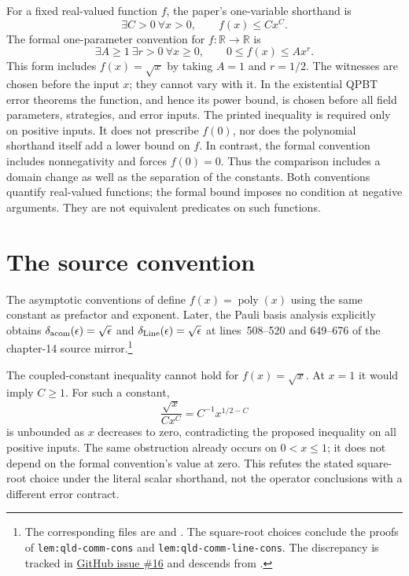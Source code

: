 \documentclass[11pt]{article}
\begin{document}
For a fixed real-valued function $f$, the paper's one-variable shorthand is
\[
  \exists C>0\ \forall x>0,\qquad f(x) \leq Cx^C.
\]
The formal one-parameter convention for $f:\mathbb R\to\mathbb R$ is
\[
  \exists A\geq1\ \exists r>0\ \forall x\geq0,\qquad
  0\leq f(x)\leq Ax^r.
\]
This form includes $f(x)=\sqrt{x}$ by taking $A=1$ and $r=1/2$.
The witnesses are chosen before the input $x$; they cannot vary with it.
In the existential QPBT error theorems the function, and hence its power
bound, is chosen before all field parameters, strategies, and error inputs.
The printed inequality is required only on positive inputs. It does not
prescribe $f(0)$, nor does the polynomial shorthand itself add a lower bound
on $f$. In contrast, the formal convention includes nonnegativity and forces
$f(0)=0$. Thus the comparison includes a domain change as well as the
separation of the constants. Both conventions quantify real-valued functions;
the formal bound imposes no condition at negative arguments. They are not
equivalent predicates on such functions.

\section{The source convention}

The asymptotic conventions of \cite[Section~4, Asymptotics]{Ji2020MIPStar} define
$f(x)=\operatorname{poly}(x)$ using the same constant as prefactor and
exponent.  Later, the Pauli basis analysis explicitly obtains
$\delta_{\mathrm{acom}}(\epsilon)=\sqrt{\epsilon}$ and
$\delta_{\mathrm{Line}}(\epsilon)=\sqrt{\epsilon}$ at lines~508--520 and 649--676 of
the chapter-14 source mirror.\footnote{The corresponding files are
 and
.  The
square-root choices conclude the proofs of \texttt{lem:qld-comm-cons} and
\texttt{lem:qld-comm-line-cons}. The discrepancy is tracked in
\href{https://github.com/Dengnifer/MIPStarRE-QPBT/issues/16}{GitHub issue \#16}
and descends from .}

The coupled-constant inequality cannot hold for $f(x)=\sqrt{x}$.  At $x=1$ it
would imply $C\geq1$.  For such a constant,
\[
  \frac{\sqrt{x}}{Cx^C}=C^{-1}x^{1/2-C}
\]
is unbounded as $x$ decreases to zero, contradicting the proposed inequality
on all positive inputs. The same obstruction already occurs on $0<x\leq1$;
it does not depend on the formal convention's value at zero. This refutes
the stated square-root choice under the literal scalar shorthand, not the
operator conclusions with a different error contract.
\end{document}
